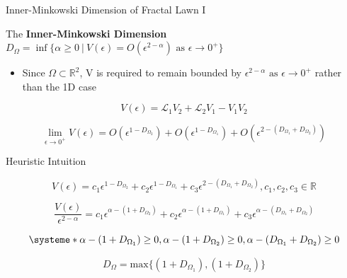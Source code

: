 \documentclass{beamer}
\newcommand{\R}{\mathbb{R}}
\newcommand{\SL}{\mathcal{L}}
\newcommand{\Om}{\Omega}
\begin{document}
\begin{frame}{Inner-Minkowski Dimension of Fractal Lawn I}

\begin{definition}
	The {\bf Inner-Minkowski Dimension} $D_{\Om} = \inf\{\alpha \geq 0\ |\ V(\epsilon) = O(\epsilon^{2 - \alpha})\text{ as }\epsilon \to 0^+\}$
\end{definition}
\pause
\begin{itemize}
	\item Since $\Om \subset \R^2$, V is required to remain bounded by $\epsilon^{2-\alpha} \text{ as }\epsilon \to 0^+ $ rather than the 1D case   
\end{itemize}
\pause
\vspace{0.2in}

	\[ V(\epsilon) = \SL_1 V_2 + \SL_2 V_1 - V_1 V_2 \]
	\pause
	
	\[ \lim_{\epsilon \to 0^+} V(\epsilon) = O(\epsilon^{1-D_{\Om_2}}) + O(\epsilon^{1-D_{\Om_1}}) + O(\epsilon^{2-(D_{\Om_1} + D_{\Om_2})})  \]
	
\end{frame}

\begin{frame}{Heuristic Intuition}

\[ V(\epsilon) = c_1\epsilon^{1-D_{\Om_2}} + c_2\epsilon^{1-D_{\Om_1}} + c_3\epsilon^{2-(D_{\Om_1} + D_{\Om_2})}, c_1,c_2,c_3 \in \R  \]
\pause

\[ \frac{V(\epsilon)}{\epsilon^{2-\alpha}} = c_1\epsilon^{\alpha - (1+D_{\Om_2})} + c_2\epsilon^{\alpha - (1+D_{\Om_1})} + c_3\epsilon^{\alpha - (D_{\Om_1} + D_{\Om_2})} \]
\pause

\[ 
\systeme*{\alpha - (1 + D_{\Om_1}) \geq 0, \alpha - (1 + D_{\Om_2}) \geq 0, \alpha - (D_{\Om_1} + D_{\Om_2}) \geq 0}
\]
\pause

\[ 
D_{\Om} = \text{max} \{ (1 + D_{\Om_1}), (1 + D_{\Om_2}) \}
\]

\end{frame}
\end{document}
